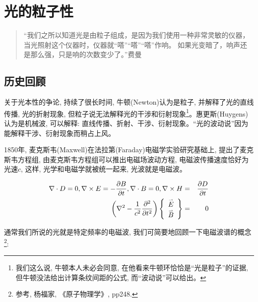 \section{光的粒子性}

\begin{quotation}
``我们之所以知道光是由粒子组成，是因为我们使用一种非常灵敏的仪器，当光照射这个仪器时，仪器就``嗒''``嗒''``嗒''作响。
如果光变暗了，响声还是那么强，只是响的次数变少了。''\qquad 费曼
\end{quotation}

\subsection{历史回顾}

关于光本性的争论, 持续了很长时间, 牛顿(Newton)认为是粒子,
并解释了光的直线传播, 光的折射现象,
但粒子说无法解释光的干涉和衍射现象\footnote{我们这么说,
牛顿本人未必会同意, 在他看来牛顿环恰恰是``光是粒子''的证据,
但牛顿没法给出计算条纹间距的公式,
而``波动说''可以给出。}。惠更斯(Huygens)认为是机械波, 可以解释:
直线传播、折射、干涉、衍射现象。``光的波动说''因为能解释干涉、衍射现象而稍占上风。

1850年, 麦克斯韦(Maxwell)在法拉第(Faraday)电磁学实验研究基础上,
提出了麦克斯韦方程组, 由麦克斯韦方程组可以推出电磁场波动方程,
电磁波传播速度恰好为光速$c$, 这样, 光学和电磁学就被统一起来,
光波就是电磁波。


\begin{eqnarray*}
\nabla  \cdot D = 0,\nabla  \times E =  - \frac{{\partial B}}{{\partial t}},\nabla  \cdot B = 0,\nabla  \times H & = & \frac{{\partial D}}{{\partial t}}  \\
\left( {\nabla ^2  - \frac{1}{{c^2 }}\frac{{\partial ^2 }}{{\partial t^2 }}} \right)\left\{ {\begin{array}{*{20}c}
   {\mathord{\buildrel{\lower3pt\hbox{$\scriptscriptstyle\rightharpoonup$}}
\over E} }  \\
   {\mathord{\buildrel{\lower3pt\hbox{$\scriptscriptstyle\rightharpoonup$}}
\over B} }  \\
\end{array}} \right\} & =  & 0
\end{eqnarray*}

通常我们所说的光就是特定频率的电磁波,
我们可简要地回顾一下电磁波谱的概念\footnote{参考, 杨福家,
《原子物理学》, pp248.}:

